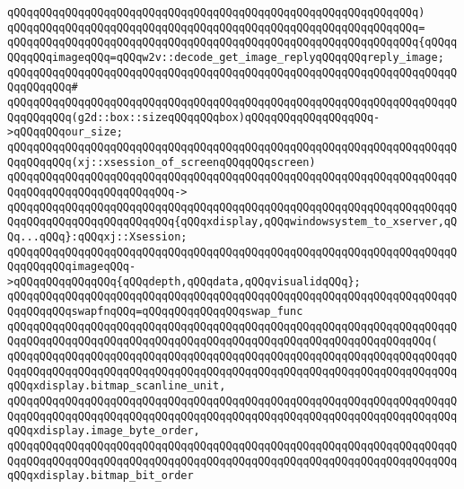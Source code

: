 \verb|qQQqqQQqqQQqqQQqqQQqqQQqqQQqqQQqqQQqqQQqqQQqqQQqqQQqqQQqqQQqqQQq)|\newline
\verb|qQQqqQQqqQQqqQQqqQQqqQQqqQQqqQQqqQQqqQQqqQQqqQQqqQQqqQQqqQQqqQQq=|\newline
\verb|qQQqqQQqqQQqqQQqqQQqqQQqqQQqqQQqqQQqqQQqqQQqqQQqqQQqqQQqqQQqqQQq{qQQqqQQqqQQqimageqQQq=qQQqw2v::decode_get_image_replyqQQqqQQqreply_image;|\newline
\verb|qQQqqQQqqQQqqQQqqQQqqQQqqQQqqQQqqQQqqQQqqQQqqQQqqQQqqQQqqQQqqQQqqQQqqQQqqQQqqQQq#|\newline
\verb|qQQqqQQqqQQqqQQqqQQqqQQqqQQqqQQqqQQqqQQqqQQqqQQqqQQqqQQqqQQqqQQqqQQqqQQqqQQqqQQq(g2d::box::sizeqQQqqQQqbox)qQQqqQQqqQQqqQQqqQQq->qQQqqQQqour_size;|\newline
\newline
\verb|qQQqqQQqqQQqqQQqqQQqqQQqqQQqqQQqqQQqqQQqqQQqqQQqqQQqqQQqqQQqqQQqqQQqqQQqqQQqqQQq(xj::xsession_of_screenqQQqqQQqscreen)|\newline
\verb|qQQqqQQqqQQqqQQqqQQqqQQqqQQqqQQqqQQqqQQqqQQqqQQqqQQqqQQqqQQqqQQqqQQqqQQqqQQqqQQqqQQqqQQqqQQqqQQq->|\newline
\verb|qQQqqQQqqQQqqQQqqQQqqQQqqQQqqQQqqQQqqQQqqQQqqQQqqQQqqQQqqQQqqQQqqQQqqQQqqQQqqQQqqQQqqQQqqQQqqQQq{qQQqxdisplay,qQQqwindowsystem_to_xserver,qQQq...qQQq}:qQQqxj::Xsession;|\newline
\newline
\newline
\verb|qQQqqQQqqQQqqQQqqQQqqQQqqQQqqQQqqQQqqQQqqQQqqQQqqQQqqQQqqQQqqQQqqQQqqQQqqQQqqQQqimageqQQq->qQQqqQQqqQQqqQQq{qQQqdepth,qQQqdata,qQQqvisualidqQQq};|\newline
\newline
\verb|qQQqqQQqqQQqqQQqqQQqqQQqqQQqqQQqqQQqqQQqqQQqqQQqqQQqqQQqqQQqqQQqqQQqqQQqqQQqqQQqswapfnqQQq=qQQqqQQqqQQqqQQqswap_func|\newline
\verb|qQQqqQQqqQQqqQQqqQQqqQQqqQQqqQQqqQQqqQQqqQQqqQQqqQQqqQQqqQQqqQQqqQQqqQQqqQQqqQQqqQQqqQQqqQQqqQQqqQQqqQQqqQQqqQQqqQQqqQQqqQQqqQQqqQQqqQQq(|\newline
\verb|qQQqqQQqqQQqqQQqqQQqqQQqqQQqqQQqqQQqqQQqqQQqqQQqqQQqqQQqqQQqqQQqqQQqqQQqqQQqqQQqqQQqqQQqqQQqqQQqqQQqqQQqqQQqqQQqqQQqqQQqqQQqqQQqqQQqqQQqqQQqqQQqxdisplay.bitmap_scanline_unit,|\newline
\verb|qQQqqQQqqQQqqQQqqQQqqQQqqQQqqQQqqQQqqQQqqQQqqQQqqQQqqQQqqQQqqQQqqQQqqQQqqQQqqQQqqQQqqQQqqQQqqQQqqQQqqQQqqQQqqQQqqQQqqQQqqQQqqQQqqQQqqQQqqQQqqQQqxdisplay.image_byte_order,|\newline
\verb|qQQqqQQqqQQqqQQqqQQqqQQqqQQqqQQqqQQqqQQqqQQqqQQqqQQqqQQqqQQqqQQqqQQqqQQqqQQqqQQqqQQqqQQqqQQqqQQqqQQqqQQqqQQqqQQqqQQqqQQqqQQqqQQqqQQqqQQqqQQqqQQqxdisplay.bitmap_bit_order|\newline
